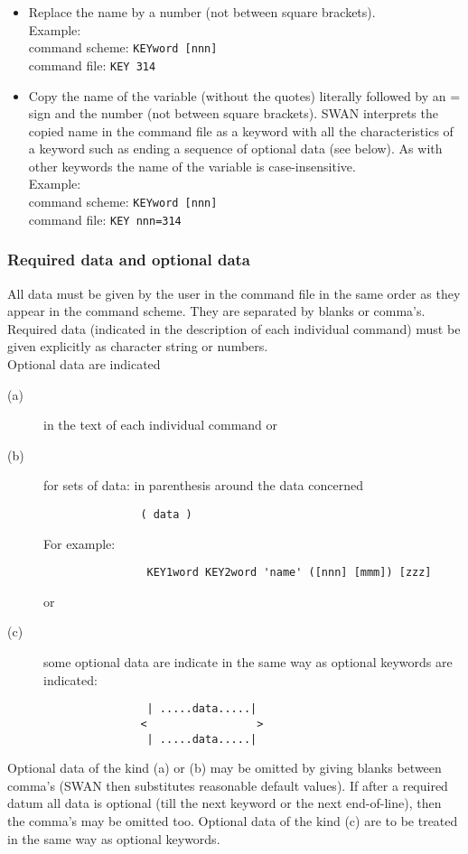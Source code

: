 \documentclass[12pt]{book}
\begin{document}
\begin{itemize}
  \item Replace the name by a number (not between square brackets).\\
        Example:\\
        command scheme: {\tt KEYword [nnn]}\\
        command file: {\tt KEY 314}
  \item Copy the name of the variable (without the quotes) literally followed by an = sign and the number (not between square brackets).
        SWAN interprets the copied name in the command file as a keyword with all the characteristics of a keyword
        such as ending a sequence of optional data (see below). As with other keywords the name of the variable is case-insensitive.\\
        Example:\\
        command scheme: {\tt KEYword [nnn]}\\
        command file: {\tt KEY nnn=314}
\end{itemize}

\subsubsection{Required data and optional data}

All data must be given by the user in the command file in the same order as they appear in the command scheme. They are separated by blanks
or comma's.
\\[2ex]
\noindent
Required data (indicated in the description of each individual command) must be given explicitly as character string or numbers.
\\[2ex]
\noindent
Optional data are indicated
\begin{description}
  \item[(a)] in the text of each individual command or
  \item[(b)] for sets of data: in parenthesis around the data concerned\\
             \begin{verbatim}
               ( data )
             \end{verbatim}
             For example:\\
             \begin{verbatim}
                KEY1word KEY2word 'name' ([nnn] [mmm]) [zzz]
             \end{verbatim}
             or
  \item[(c)] some optional data are indicate in the same way as optional keywords are indicated:
             \begin{verbatim}
                | .....data.....|
               <                 >
                | .....data.....|
             \end{verbatim}
\end{description}
Optional data of the kind (a) or (b) may be omitted by giving blanks between comma's (SWAN then substitutes reasonable default values).
If after a required datum all data is optional (till the next keyword or the next end-of-line), then the comma's may be omitted too.
Optional data of the kind (c) are to be treated in the same way as optional keywords.
\end{document}
